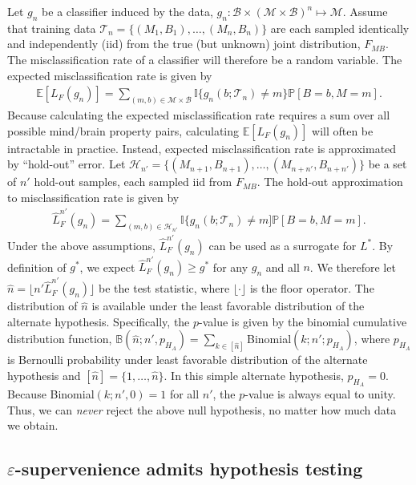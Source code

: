 \documentclass{article}
\newcommand{\mB}{\mathcal{B}}
\newcommand{\mM}{\mathcal{M}}
\newcommand{\PP}{\mathbb{P}}           %
\newcommand{\EE}{\mathbb{E}}           %
\newcommand{\II}{\mathbb{I}}           %
\newcommand{\eps}{\varepsilon}
\providecommand{\mc}[1]{\mathcal{#1}}
\providecommand{\mh}[1]{\widehat{#1}}
\newcommand{\hL}{\widehat{L}}
\begin{document}
Let $g_n$ be a classifier induced by the data, $g_n:\mB \times (\mc{M} \times \mc{B})^n \mapsto \mM$.   Assume that training data $\mc{T}_n=\{(M_{1},B_{1}), \ldots, (M_{n},B_{n})\}$ are each sampled identically and independently (iid) from the true (but unknown) joint distribution, $F_{MB}$.  The misclassification rate of a classifier will therefore be a random variable. The expected misclassification rate is given by 
\begin{align}
\EE[L_F(g_n)]=\sum_{(m,b)  \in \mc{M}\times \mc{B}} \II\{g_n(b; \mc{T}_n) \neq m\} \PP[B=b,M=m].
\end{align}
Because calculating the expected misclassification rate requires a sum over all possible mind/brain property pairs, calculating $\EE[L_F(g_n)]$ will often be intractable in practice.  Instead, expected misclassification rate is approximated by ``hold-out'' error.  Let $\mc{H}_{n'}=\{(M_{n+1},B_{n+1}), \ldots, (M_{n+n'},B_{n+n'})\}$ be a set of $n'$ hold-out samples, each sampled iid from $F_{MB}$.  The hold-out approximation to misclassification rate is given by
\begin{align}
\hL^{n'}_{F}(g_{n}) = \sum_{(m,b) \in \mc{H}_{n'}}\II \{g_{n}(b; \mc{T}_{n})\neq m] \PP[B=b,M=m].	
\end{align}
Under the above assumptions, $\hL^{n'}_F(g_n)$ can be used as a surrogate for $L^*$.  By definition of $g^*$, we expect $\hL^{n'}_F(g_n) \geq g^*$ for any $g_n$ and all $n$.   We therefore let $\mh{n}= \lfloor n' \hL^{n'}_{F}(g_n) \rfloor$ be the test statistic, where $\lfloor \cdot \rfloor$ is the floor operator.  The distribution of $\mh{n}$ is available under the least favorable distribution of the alternate hypothesis.  Specifically,  the $p$-value is given by the binomial cumulative distribution function, $\mathbb{B}(\mh{n}; n', p_{H_A})= \sum_{k \in [\mh{n}]}$Binomial$(k; n'; p_{H_A})$, where $p_{H_A}$ is Bernoulli probability under least favorable distribution of the alternate hypothesis and $[\mh{n}]=\{1,\ldots, \mh{n}\}$.  In this simple alternate hypothesis, $p_{H_A}=0$. Because Binomial$(k; n', 0)=1$ for all $n'$, the $p$-value is always equal to unity.    Thus, we can \emph{never} reject the above null hypothesis, no matter how much data we obtain.





\subsection*{$\eps$-supervenience admits hypothesis testing} %
\label{sub:hypothesis_testing}
\end{document}
